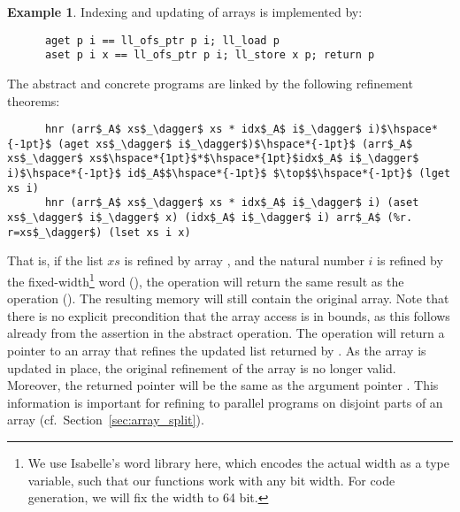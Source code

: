 \documentclass[sn-mathphys,Numbered]{sn-jnl}
\theoremstyle{thmstyleone}%
\theoremstyle{definition}%
\newtheorem{example}{Example}%
\theoremstyle{thmstylethree}%
\begin{document}
\begin{example}
    Indexing and updating of arrays is implemented by:
    \begin{lstlisting}
      aget p i == ll_ofs_ptr p i; ll_load p
      aset p i x == ll_ofs_ptr p i; ll_store x p; return p
    \end{lstlisting}
    The abstract and concrete programs are linked by the following refinement theorems:
    \begin{lstlisting}
      hnr (arr$_A$ xs$_\dagger$ xs * idx$_A$ i$_\dagger$ i)$\hspace*{-1pt}$ (aget xs$_\dagger$ i$_\dagger$)$\hspace*{-1pt}$ (arr$_A$ xs$_\dagger$ xs$\hspace*{1pt}$*$\hspace*{1pt}$idx$_A$ i$_\dagger$ i)$\hspace*{-1pt}$ id$_A$$\hspace*{-1pt}$ $\top$$\hspace*{-1pt}$ (lget xs i)
      hnr (arr$_A$ xs$_\dagger$ xs * idx$_A$ i$_\dagger$ i) (aset xs$_\dagger$ i$_\dagger$ x) (idx$_A$ i$_\dagger$ i) arr$_A$ (%r. r=xs$_\dagger$) (lset xs i x)
    \end{lstlisting}
    That is, if the list \is$xs$ is refined by array , and the natural number \is$i$ is refined
    by the fixed-width\footnote{We use Isabelle's word library here, which encodes the actual width as a type variable,
    such that our functions work with any bit width. For code generation, we will fix the width to 64 bit.} word  (),
    the  operation will return the same result as the  operation ().
    The resulting memory will still contain the original array. Note that there is no explicit precondition that the array access
    is in bounds, as this follows already from the assertion in the abstract  operation.
    The  operation will return a pointer to an array that refines the updated list returned by .
    As the array is updated in place, the original refinement of the array is no longer valid.
    Moreover, the returned pointer  will be the same as the argument pointer .
    This information is important for refining to parallel programs on disjoint parts of an
    array (cf.\ Section~\ref{sec:array_split}).


\end{example}
\end{document}
